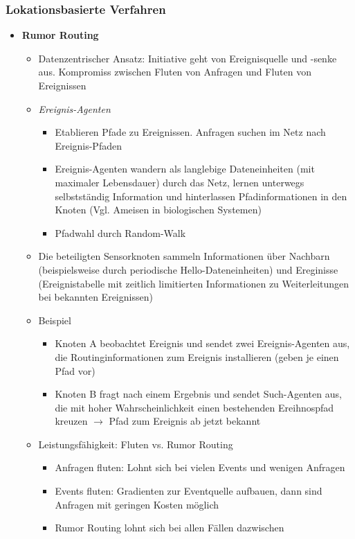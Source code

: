 \subsubsection{Lokationsbasierte Verfahren}
\begin{itemize}
	\item \textbf{Rumor Routing}
	\begin{itemize}
		\item Datenzentrischer Ansatz: Initiative geht von Ereignisquelle und -senke aus. Kompromiss zwischen Fluten von Anfragen und Fluten von Ereignissen
		\item \textit{Ereignis-Agenten}
		\begin{itemize}
			\item Etablieren Pfade zu Ereignissen. Anfragen suchen im Netz nach Ereignis-Pfaden
			\item Ereignis-Agenten wandern als langlebige Dateneinheiten (mit maximaler Lebensdauer) durch das Netz, lernen unterwegs selbstständig Information und hinterlassen Pfadinformationen in den Knoten (Vgl. Ameisen in biologischen Systemen)
			\item Pfadwahl durch Random-Walk
		\end{itemize}
		\item Die beteiligten Sensorknoten sammeln Informationen über Nachbarn (beispielsweise durch periodische Hello-Dateneinheiten) und Ereginisse (Ereignistabelle mit zeitlich limitierten Informationen zu Weiterleitungen bei bekannten Ereignissen)
		\item Beispiel
		\begin{itemize}
			\item Knoten A beobachtet Ereignis und sendet zwei Ereignis-Agenten aus, die Routinginformationen zum Ereignis installieren (geben je einen Pfad vor)
			\item Knoten B fragt nach einem Ergebnis und sendet Such-Agenten aus, die mit hoher Wahrscheinlichkeit einen bestehenden Ereihnospfad kreuzen \(\rightarrow\) Pfad zum Ereignis ab jetzt bekannt
		\end{itemize}
		\item Leistungsfähigkeit: Fluten vs. Rumor Routing
		\begin{itemize}
			\item Anfragen fluten: Lohnt sich bei vielen Events und wenigen Anfragen
			\item Events fluten: Gradienten zur Eventquelle aufbauen, dann sind Anfragen mit geringen Kosten möglich
			\item Rumor Routing lohnt sich bei allen Fällen dazwischen 

\end{itemize}
\end{itemize}
\end{itemize}
